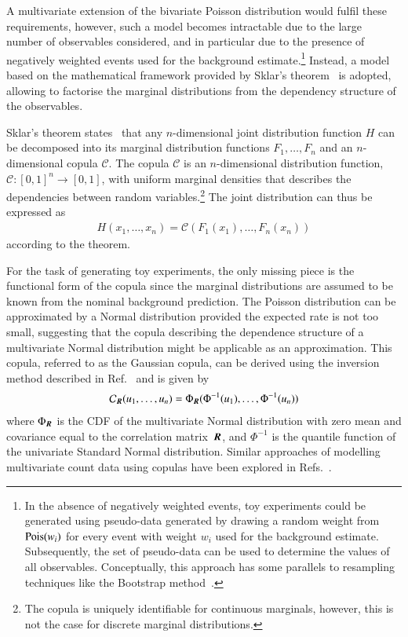 A multivariate extension of the bivariate Poisson distribution would
fulfil these requirements, however, such a model becomes intractable
due to the large number of observables considered, and in particular
due to the presence of negatively weighted events used for the
background estimate.\footnote{In the absence of negatively weighted
  events, toy experiments could be generated using pseudo-data
  generated by drawing a random weight from $\operatorname{Pois}(w_i)$ for every
  event with weight $w_i$ used for the background
  estimate. Subsequently, the set of pseudo-data can be used to
  determine the values of all observables. Conceptually, this approach
  has some parallels to resampling techniques like the Bootstrap
  method~\cite{10.1214/aos/1176344552,efron1994introduction}.} Instead,
a model based on the mathematical framework provided by Sklar's
theorem~\cite{Sklar1959FonctionsDR} is adopted, allowing to factorise
the marginal distributions from the dependency structure of the
observables.

Sklar's theorem states~\cite{nelsen} that any $n$-dimensional joint
distribution function $H$ can be decomposed into its marginal
distribution functions $F_1, \dots, F_n$ and an $n$-dimensional copula
$\mathcal{C}$. The copula $\mathcal{C}$ is an $n$-dimensional
distribution function, $\mathcal{C}: [0, 1]^n \rightarrow [0, 1]$,
with uniform marginal densities that describes the dependencies
between random variables.\footnote{The copula is uniquely identifiable
  for continuous marginals, however, this is not the case for discrete
  marginal distributions.} The joint distribution can thus be
expressed as
\begin{align*}
  H(x_1, \dots, x_n) = \mathcal{C}(F_1(x_1), \dots, F_n(x_n))
\end{align*}
according to the theorem.

For the task of generating toy experiments, the only missing piece is
the functional form of the copula since the marginal distributions are
assumed to be known from the nominal background prediction. The
Poisson distribution can be approximated by a Normal distribution
provided the expected rate is not too small, suggesting that the
copula describing the dependence structure of a multivariate Normal
distribution might be applicable as an approximation. This copula,
referred to as the Gaussian copula, can be derived using the inversion
method described in Ref.~\cite{nelsen} and is given by
\begin{align}
  \label{eq:gaussian_copula}
  \mathcal{C}_{\myvec{R}}(u_1, \dots, u_n) = \Phi_{\myvec{R}}(\Phi^{-1}(u_1), \dots, \Phi^{-1}(u_n))
\end{align}
where $\Phi_{\myvec{R}}$ is the CDF of the multivariate Normal
distribution with zero mean and covariance equal to the correlation
matrix~$\myvec{R}$, and $\Phi^{-1}$ is the quantile function of the
univariate Standard Normal distribution. Similar approaches of
modelling multivariate count data using copulas have been explored in
Refs.~\cite{10.1002/wics.1398}.

